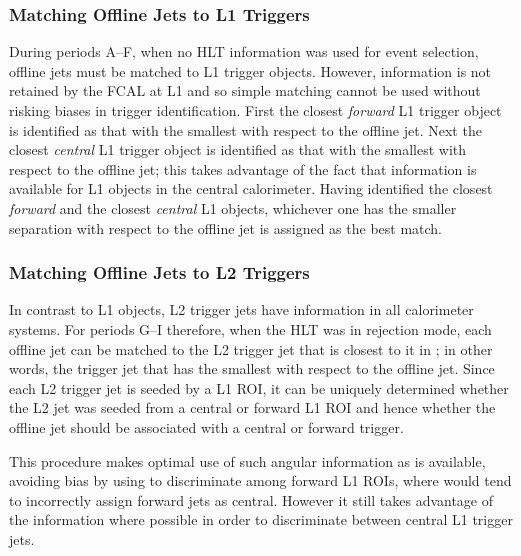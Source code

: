 \subsubsection{Matching Offline Jets to L1 Triggers}
During periods A--F, when no HLT information was used for event selection,
offline jets must be matched to L1 trigger objects. However, \pseudorap
information is not retained by the FCAL at L1 and so simple \DeltaR matching cannot be
used without risking biases in trigger identification. First the closest \emph{forward} L1 trigger object is identified
as that with the smallest \DeltaPhi with respect to the offline jet. Next the closest
\emph{central} L1 trigger object is identified as that with the smallest \DeltaR
with respect to the offline jet; this takes advantage of the fact that \pseudorap information
is available for L1 objects in the central calorimeter. Having identified the
closest \emph{forward} and the closest \emph{central} L1 objects, whichever one
has the smaller \DeltaPhi separation with respect to the offline jet is assigned
as the best match.

\subsubsection{Matching Offline Jets to L2 Triggers}
In contrast to L1 objects, L2 trigger jets have \pseudorap information in all calorimeter
systems. For periods G--I therefore, when the HLT was in rejection mode, each offline
jet can be matched to the L2 trigger jet that is closest to it in \DeltaR; in other
words, the trigger jet that has the smallest \DeltaR with respect to the offline jet.
Since each L2 trigger jet is seeded by a L1 ROI, it can be uniquely determined whether
the L2 jet was seeded from a central or forward L1 ROI and hence whether the offline
jet should be associated with a central or forward trigger.

This procedure makes optimal use of such angular information as is available, avoiding
bias by using \DeltaPhi to discriminate among forward L1 ROIs, where \DeltaR would
tend to incorrectly assign forward jets as central. However it still takes advantage of
the \pseudorap information where possible in order to discriminate between central
L1 trigger jets.

